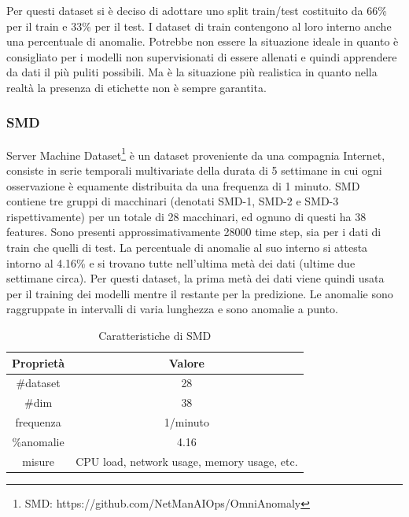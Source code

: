 Per questi dataset si è deciso di adottare uno split train/test costituito da 66\% per il train e 33\% per il test. I dataset di train contengono al loro interno anche una percentuale di anomalie. Potrebbe non essere la situazione ideale in quanto è consigliato per i modelli non supervisionati di essere allenati e quindi apprendere da dati il più puliti possibili. Ma è la situazione più realistica in quanto nella realtà la presenza di etichette non è sempre garantita.  

\subsubsection{SMD}
Server Machine Dataset\footnote{SMD: https://github.com/NetManAIOps/OmniAnomaly} è un dataset proveniente da una compagnia Internet, consiste in serie temporali multivariate della durata di 5 settimane in cui ogni osservazione è equamente distribuita da una frequenza di 1 minuto. SMD contiene tre gruppi di macchinari (denotati SMD-1, SMD-2 e SMD-3 rispettivamente) per un totale di 28 macchinari, ed ognuno di questi ha 38 features. Sono presenti approssimativamente 28000 time step, sia per i dati di train che quelli di test. 
La percentuale di anomalie al suo interno si attesta intorno al 4.16\% e si trovano tutte nell'ultima metà dei dati (ultime due settimane circa). Per questi dataset, la prima metà dei dati viene quindi usata per il training dei modelli mentre il restante per la predizione.
Le anomalie sono raggruppate in intervalli di varia lunghezza e sono anomalie a punto.
\begin{table}
\centering
\caption{\label{smd}Caratteristiche di SMD}
\begin{tabular}{|c|c|} 
\hline
\textbf{Proprietà} & \textbf{Valore}                              \\ 
\hline
\#dataset     & 28                                           \\ 
\hline
\#dim     & 38                                           \\ 
\hline
frequenza         & 1/minuto                                  
                                   \\ 
\hline
\%anomalie & 4.16                                         \\ 
\hline
misure              & CPU load, network usage, memory usage, etc.  \\
\hline
\end{tabular}
\end{table}


